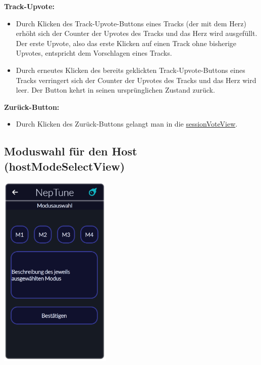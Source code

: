 \documentclass[oneside, ngerman]{sdqtechreport}
\begin{document}
\textbf{Track-Upvote:}
\begin{itemize}
    \item Durch Klicken des Track-Upvote-Buttons eines Tracks (der mit dem Herz) erhöht sich der Counter der Upvotes des Tracks und das Herz wird ausgefüllt. Der erste Upvote, also das erste Klicken auf einen Track ohne bisherige Upvotes, entspricht dem Vorschlagen eines Tracks.
    \item Durch erneutes Klicken des bereits geklickten Track-Upvote-Buttons eines Tracks verringert sich der Counter der Upvotes des Tracks und das Herz wird leer. Der Button kehrt in seinen ursprünglichen Zustand zurück.
\end{itemize}

\textbf{Zurück-Button:}
\begin{itemize}
    \item Durch Klicken des Zurück-Buttons gelangt man in die  \hyperlink{sessionVoteView}{sessionVoteView}.
\end{itemize}

\subsection{Moduswahl für den Host (hostModeSelectView)}
\label{sec:Benutzeroberfläche:hostModeSelectView}


\begin{center}
    \hypertarget{hostModeSelectView}{}
    \includegraphics[width=0.4\textwidth]{LATEX/Pflichtenheft/GraphicDesigns/hostModusSelectPage.png}
\end{center}
\end{document}
